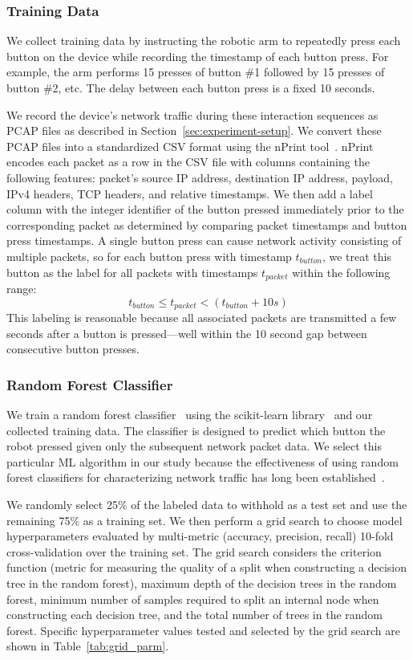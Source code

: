 \subsubsection{Training Data}
We collect training data by instructing the robotic arm to repeatedly press each button on the device while recording the timestamp of each button press. For example, the arm performs 15 presses of button \#1 followed by 15 presses of button \#2, etc. The delay between each button press is a fixed 10 seconds. 

We record the device's network traffic during these interaction sequences as PCAP files as described in Section~\ref{sec:experiment-setup}.
We convert these PCAP files into a standardized CSV format using the nPrint tool~\cite{holland2020nprint}. nPrint encodes each packet as a row in the CSV file with columns containing the following features: packet's source IP address, destination IP address, payload, IPv4 headers, TCP headers, and relative timestamps. We then add a label column with the integer identifier of the button pressed immediately prior to the corresponding packet as determined by comparing packet timestamps and button press timestamps. A single button press can cause network activity consisting of multiple packets, so for each button press with timestamp $t_{button}$, we treat this button as the label for all packets with timestamps $t_{packet}$ within the following range: 
\[t_{button} \leq t_{packet} < (t_{button} + 10s)\] 
This labeling is reasonable because all associated packets are transmitted a few seconds after a button is pressed---well within the 10 second gap between consecutive button presses. 

\subsubsection{Random Forest Classifier}
We train a random forest classifier~\cite{ho1995random} using the scikit-learn library~\cite{scikit-learn} and our collected training data. 
The classifier is designed to predict which button the robot pressed given only the subsequent network packet data. We select this particular ML algorithm in our study because the effectiveness of using random forest classifiers for characterizing network traffic has long been established~\cite{wang2015network,zhang2014robust,jun2007internet}.

We randomly select 25\% of the labeled data to withhold as a test set and use the remaining 75\% as a training set.
We then perform a grid search to choose model hyperparameters evaluated by multi-metric (accuracy, precision, recall) 10-fold cross-validation over the training set. The grid search considers the criterion function (metric for measuring the quality of a split when constructing a decision tree in the random forest), maximum depth of the decision trees in the random forest, minimum number of samples required to split an internal node when constructing each decision tree, and the total number of trees in the random forest.
Specific hyperparameter values tested and selected by the grid search are shown in Table~\ref{tab:grid_parm}.

